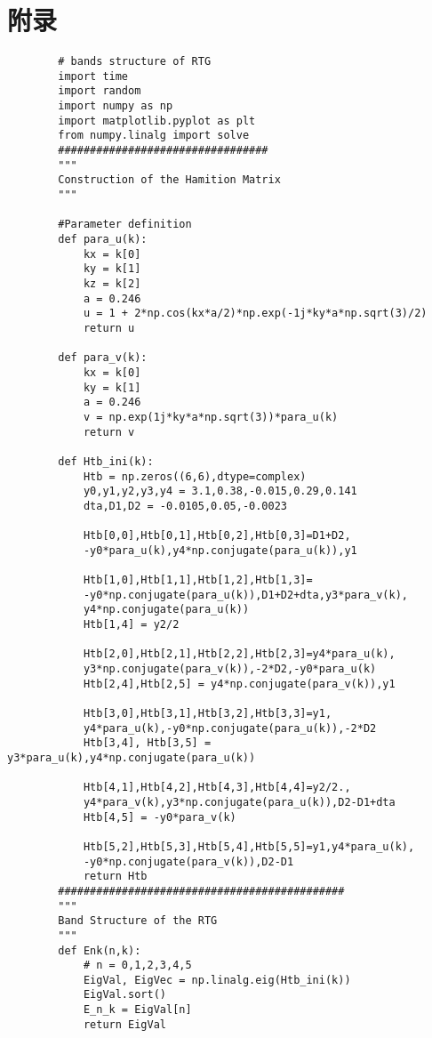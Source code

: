 \documentclass[UTF8]{ctexart}
\begin{document}
\begin{multicols}{2}
\begin{thebibliography}{100}
		\end{thebibliography}
	\end{multicols}%
    
    \newpage
    \section{附录}
	\begin{lstlisting}
		# bands structure of RTG
		import time
		import random
		import numpy as np
		import matplotlib.pyplot as plt
		from numpy.linalg import solve
		#################################
		"""
		Construction of the Hamition Matrix
		"""
		
		#Parameter definition
		def para_u(k):
			kx = k[0]
			ky = k[1]
			kz = k[2]
			a = 0.246
			u = 1 + 2*np.cos(kx*a/2)*np.exp(-1j*ky*a*np.sqrt(3)/2)
			return u
			
		def para_v(k):
			kx = k[0]
			ky = k[1]
			a = 0.246
			v = np.exp(1j*ky*a*np.sqrt(3))*para_u(k)
			return v
			
		def Htb_ini(k):
			Htb = np.zeros((6,6),dtype=complex)
			y0,y1,y2,y3,y4 = 3.1,0.38,-0.015,0.29,0.141
			dta,D1,D2 = -0.0105,0.05,-0.0023

			Htb[0,0],Htb[0,1],Htb[0,2],Htb[0,3]=D1+D2,
			-y0*para_u(k),y4*np.conjugate(para_u(k)),y1
			
			Htb[1,0],Htb[1,1],Htb[1,2],Htb[1,3]=
			-y0*np.conjugate(para_u(k)),D1+D2+dta,y3*para_v(k),
			y4*np.conjugate(para_u(k))
			Htb[1,4] = y2/2
			
			Htb[2,0],Htb[2,1],Htb[2,2],Htb[2,3]=y4*para_u(k),
			y3*np.conjugate(para_v(k)),-2*D2,-y0*para_u(k)
			Htb[2,4],Htb[2,5] = y4*np.conjugate(para_v(k)),y1
			
			Htb[3,0],Htb[3,1],Htb[3,2],Htb[3,3]=y1,
			y4*para_u(k),-y0*np.conjugate(para_u(k)),-2*D2
			Htb[3,4], Htb[3,5] = y3*para_u(k),y4*np.conjugate(para_u(k))
			
			Htb[4,1],Htb[4,2],Htb[4,3],Htb[4,4]=y2/2.,
			y4*para_v(k),y3*np.conjugate(para_u(k)),D2-D1+dta
			Htb[4,5] = -y0*para_v(k)
			
			Htb[5,2],Htb[5,3],Htb[5,4],Htb[5,5]=y1,y4*para_u(k),
			-y0*np.conjugate(para_v(k)),D2-D1
			return Htb
		#############################################
		"""
		Band Structure of the RTG
		"""
		def Enk(n,k):
			# n = 0,1,2,3,4,5
			EigVal, EigVec = np.linalg.eig(Htb_ini(k))
			EigVal.sort()
			E_n_k = EigVal[n]
			return EigVal
		

\end{lstlisting}
\end{document}
